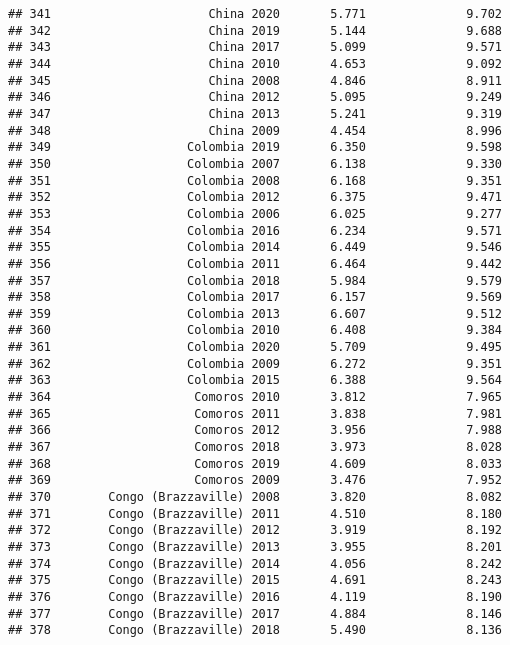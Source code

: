 \documentclass[
]{article}
\begin{document}
\begin{verbatim}
## 341                      China 2020       5.771              9.702
## 342                      China 2019       5.144              9.688
## 343                      China 2017       5.099              9.571
## 344                      China 2010       4.653              9.092
## 345                      China 2008       4.846              8.911
## 346                      China 2012       5.095              9.249
## 347                      China 2013       5.241              9.319
## 348                      China 2009       4.454              8.996
## 349                   Colombia 2019       6.350              9.598
## 350                   Colombia 2007       6.138              9.330
## 351                   Colombia 2008       6.168              9.351
## 352                   Colombia 2012       6.375              9.471
## 353                   Colombia 2006       6.025              9.277
## 354                   Colombia 2016       6.234              9.571
## 355                   Colombia 2014       6.449              9.546
## 356                   Colombia 2011       6.464              9.442
## 357                   Colombia 2018       5.984              9.579
## 358                   Colombia 2017       6.157              9.569
## 359                   Colombia 2013       6.607              9.512
## 360                   Colombia 2010       6.408              9.384
## 361                   Colombia 2020       5.709              9.495
## 362                   Colombia 2009       6.272              9.351
## 363                   Colombia 2015       6.388              9.564
## 364                    Comoros 2010       3.812              7.965
## 365                    Comoros 2011       3.838              7.981
## 366                    Comoros 2012       3.956              7.988
## 367                    Comoros 2018       3.973              8.028
## 368                    Comoros 2019       4.609              8.033
## 369                    Comoros 2009       3.476              7.952
## 370        Congo (Brazzaville) 2008       3.820              8.082
## 371        Congo (Brazzaville) 2011       4.510              8.180
## 372        Congo (Brazzaville) 2012       3.919              8.192
## 373        Congo (Brazzaville) 2013       3.955              8.201
## 374        Congo (Brazzaville) 2014       4.056              8.242
## 375        Congo (Brazzaville) 2015       4.691              8.243
## 376        Congo (Brazzaville) 2016       4.119              8.190
## 377        Congo (Brazzaville) 2017       4.884              8.146
## 378        Congo (Brazzaville) 2018       5.490              8.136

\end{verbatim}
\end{document}
